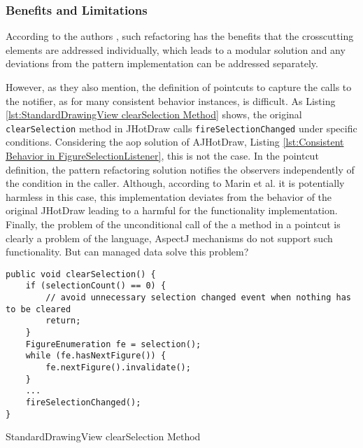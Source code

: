 \subsubsection{Benefits and Limitations}
According to the authors \cite{marin2005approach}, such refactoring has the benefits that the crosscutting elements are addressed individually, which leads to a modular solution and any deviations from the pattern implementation can be addressed separately.

However, as they also mention, the definition of pointcuts to capture the calls to the notifier, as for many consistent behavior instances, is difficult. 
As Listing \ref{lst:StandardDrawingView clearSelection Method} shows, the original \texttt{clearSelection} method in JHotDraw calls \texttt{fireSelectionChanged} under specific conditions.
Considering the \ac{aop} solution of AJHotDraw, Listing \ref{lst:Consistent Behavior in FigureSelectionListener}, this is not the case.
In the pointcut definition, the pattern refactoring solution notifies the observers independently of the condition in the caller.
Although, according to Marin et al. it is potentially harmless in this case, this implementation deviates from the behavior of the original JHotDraw leading to a harmful for the functionality implementation.
Finally, the problem of the unconditional call of the a method in a pointcut is clearly a problem of the language, AspectJ mechanisms do not support such functionality. But can managed data solve this problem?

\begin{sourcecode}
	\begin{lstlisting}[language=AspectJ, escapechar=|]
public void clearSelection() {
	if (selectionCount() == 0) {
		// avoid unnecessary selection changed event when nothing has to be cleared
		return;
	}
	FigureEnumeration fe = selection();
	while (fe.hasNextFigure()) {
		fe.nextFigure().invalidate();
	}
	...
	fireSelectionChanged();
}
	\end{lstlisting}
	\caption{StandardDrawingView clearSelection Method}
	\label{lst:StandardDrawingView clearSelection Method}
\end{sourcecode}

